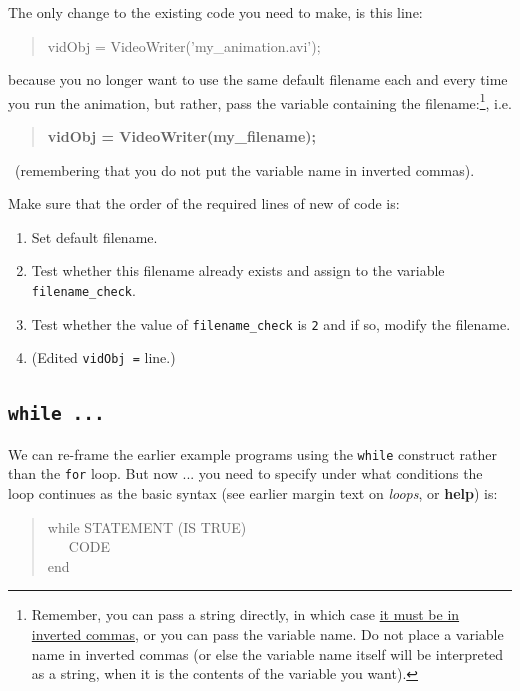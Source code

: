 \documentclass{tufte-book} %
\newenvironment{docspec}{\begin{quotation}\ttfamily\parskip0pt\parindent0pt\ignorespaces}{\end{quotation}}
\newenvironment{docspecbold}{\begin{quotation}\ttfamily\bfseries\parskip0pt\parindent0pt\ignorespaces}{\end{quotation}}
\begin{document}
The only change to the existing code you need to make, is this line:
\begin{docspec}
vidObj = VideoWriter('my\_animation.avi');
\end{docspec}
because you no longer want to use the same default filename each and every time you run the animation, but rather, pass the variable containing the filename:\footnote{Remember, you can pass a string directly, in which case \uline{it must be in inverted commas}, or you can pass the variable name. Do not place a variable name in inverted commas (or else the variable name itself will be interpreted as a string, when it is the contents of the variable you want).}, i.e.
\begin{docspecbold}
vidObj = VideoWriter(my\_filename);
\end{docspecbold}\
(remembering that you do not put the variable name in inverted commas).

Make sure that the order of the required lines of new of code is:

\begin{enumerate}[noitemsep]
\setlength{\itemindent}{.2in}
\item Set default filename.
\item Test whether this filename already exists and assign to the variable \texttt{filename\_check}.
\item Test whether the value of \texttt{filename\_check} is \texttt{2} and if so, modify the filename.
\item (Edited \texttt{vidObj =} line.)
\end{enumerate}


\newpage 

\subsection{\texttt{while ...}}

We can re-frame the earlier example programs using the \texttt{while} construct rather than the \texttt{for} loop. But now ... you need to specify under what conditions the loop continues as the basic syntax (see earlier margin text on \textit{loops}, or \textbf{help}) is:
\begin{docspec}
while STATEMENT (IS TRUE)
\\ \ \ \ CODE
\\end
\end{docspec}
\end{document}
